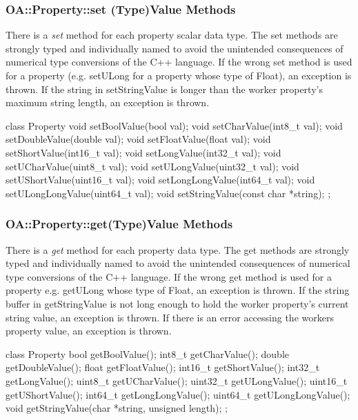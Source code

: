 \documentclass[10pt, a4paper, oneside]{article}
\renewcommand\_{\textunderscore\allowbreak} %
\begin{document}
\subsubsection{OA::Property::set (Type)Value Methods}There is a \emph{set} method for each property scalar data type.  The set methods are strongly typed and individually named to avoid the unintended consequences of numerical type conversions of the C++ language.  If the wrong set method is used for a property (e.g. setULong for a property whose type of Float), an exception is thrown.  If the string in setStringValue is longer than the worker property's maximum string length, an exception is thrown.
\begin{ocpixml}  
class Property {
  void setBoolValue(bool val);
  void setCharValue(int8_t val);
  void setDoubleValue(double val);
  void setFloatValue(float val);
  void setShortValue(int16_t val);
  void setLongValue(int32_t val);
  void setUCharValue(uint8_t val);
  void setULongValue(uint32_t val);
  void setUShortValue(uint16_t val);
  void setLongLongValue(int64_t val);
  void setULongLongValue(uint64_t val);
  void setStringValue(const char *string);
};\end{ocpixml} 
\subsubsection{OA::Property::get(Type)Value Methods} 
There is a \emph{get} method for each property data type. The get methods are strongly typed and individually named to avoid the unintended consequences of numerical type conversions of the C++ language.  If the wrong get method is used for a property e.g. getULong whose type of Float, an exception is thrown.  If the string buffer in getStringValue is not long enough to hold the worker property's current string value, an exception is thrown.  If there is an error accessing the workers property value, an exception is thrown. 
\begin{ocpixml}  
class Property {
  bool getBoolValue();
  int8_t getCharValue();
  double getDoubleValue();
  float getFloatValue();
  int16_t getShortValue();
  int32_t getLongValue();
  uint8_t getUCharValue();
  uint32_t getULongValue();
  uint16_t getUShortValue();
  int64_t getLongLongValue();
  uint64_t getULongLongValue();
  void getStringValue(char *string, unsigned length);
}; \end{ocpixml} 
\end{document}
